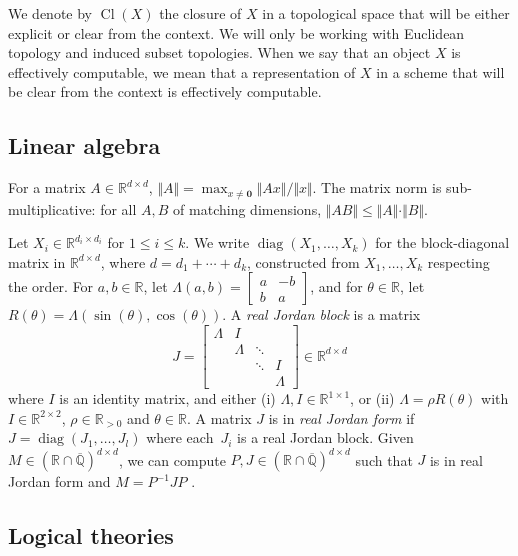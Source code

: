 \documentclass[a4paper,UKenglish,cleveref]{lipics-v2021}
\newcommand{\rel}{\mathbb{R}}
\newcommand{\rat}{\mathbb{Q}}
\newcommand{\alg}{\overline{\rat}}
\newcommand{\ralg}{\rel \cap \alg}
\newcommand{\diag}{\operatorname{diag}}
\newcommand{\zerovec}{\mathbf{0}}
\begin{document}
We denote by $\operatorname{Cl}(X)$ the closure of $X$ in a topological space that will be either explicit or clear from the context. 
We will only be working with Euclidean topology and induced subset topologies.
When we say that an object $X$ is effectively computable, we mean that a representation of $X$ in a scheme that will be clear from the context is effectively computable.

\subsection{Linear algebra}


For a matrix $A \in \rel^{d\times d}$, $\Vert A \Vert = \max_{x \ne \zerovec} \Vert A x\Vert / \Vert x \Vert$.
The matrix norm is sub-multiplicative: for all $A,B$ of matching dimensions, $\Vert A B \Vert \le \Vert A \Vert \cdot \Vert B \Vert$.

Let $X_i \in \rel^{d_i \times d_i}$ for $1\le i \le k$.
We write $\diag(X_1,\ldots,X_k)$ for the block-diagonal matrix in $\rel^{d\times d}$, where $d = d_1 + \cdots + d_k$, constructed from $X_1,\ldots,X_k$ respecting the order.
For $a,b \in \rel$, let $\Lambda(a,b) =  \begin{bmatrix}
	a & -b\\
	b & a
\end{bmatrix}$, and for $\theta \in \rel$, let $R(\theta) = \Lambda(\sin(\theta), \cos(\theta))$.
A \emph{real Jordan block} is a matrix 
\begin{equation}
	\label{eq:prelims-jordan-block}
	J = 
	\begin{bmatrix}
		\Lambda & I \\
		&\Lambda & \ddots\\
		&&\ddots & I\\
		&&&\Lambda
	\end{bmatrix} \in \rel^{d \times d}
\end{equation}
where $I$ is an identity matrix, and either (i) $\Lambda, I \in \rel^{1\times 1}$, or (ii) $\Lambda = \rho R(\theta)$ with $I \in \rel^{2\times 2}$, $\rho \in \rel_{> 0}$ and $\theta \in \rel$.
A matrix $J$ is in \emph{real Jordan form} if $J = \diag(J_1,\ldots,J_l)$ where each~$J_i$ is a real Jordan block. 
Given $M \in (\ralg)^{d\times d}$, we can compute $P, J \in (\ralg)^{d\times d}$ such that $J$ is in real Jordan form and $M = P^{-1}JP$ \cite{cai1994computing}.



\subsection{Logical theories}
\end{document}
